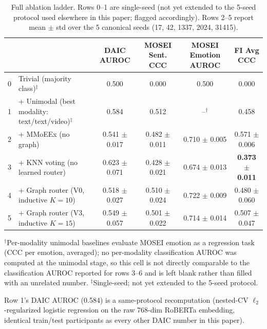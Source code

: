 \documentclass[letterpaper]{article}
\begin{document}
\begin{table}[t]
\centering
\caption{Full ablation ladder. Rows 0--1 are single-seed (not yet extended to the 5-seed protocol used elsewhere in this paper; flagged accordingly). Rows 2--5 report mean $\pm$ std over the 5 canonical seeds (17, 42, 1337, 2024, 31415).}
\label{tab:full_ablation}
\small
\begin{tabular}{llcccc}
\toprule
 & & DAIC AUROC & MOSEI Sent. CCC & MOSEI Emotion AUROC & FI Avg CCC \\
\midrule
0 & Trivial (majority class)$^\ddagger$ & 0.500 & 0.000 & 0.500 & 0.000 \\
1 & + Unimodal (best modality: text/text/video)$^\ddagger$ & 0.584 & 0.512 & --$^\dagger$ & 0.458 \\
2 & + MMoEEx (no graph) & 0.541 $\pm$ 0.017 & 0.482 $\pm$ 0.011 & 0.710 $\pm$ 0.005 & 0.571 $\pm$ 0.006 \\
3 & + KNN voting (no learned router) & 0.623 $\pm$ 0.071 & 0.428 $\pm$ 0.021 & 0.674 $\pm$ 0.013 & \textbf{0.373 $\pm$ 0.011} \\
4 & + Graph router (V0, inductive $K{=}10$) & 0.518 $\pm$ 0.027 & 0.510 $\pm$ 0.024 & 0.722 $\pm$ 0.009 & 0.480 $\pm$ 0.060 \\
5 & + Graph router (V3, inductive $K{=}15$) & 0.549 $\pm$ 0.057 & 0.501 $\pm$ 0.022 & 0.714 $\pm$ 0.014 & 0.507 $\pm$ 0.047 \\
\bottomrule
\end{tabular}

\vspace{2pt}
{\footnotesize $^\dagger$Per-modality unimodal baselines evaluate MOSEI emotion as a regression task (CCC per emotion, averaged); no per-modality classification AUROC was computed at the unimodal stage, so this cell is not directly comparable to the classification AUROC reported for rows 3--6 and is left blank rather than filled with an unrelated number. $^\ddagger$Single-seed; not yet extended to the 5-seed protocol.}
\end{table}

Row 1's DAIC AUROC (0.584) is a same-protocol recomputation (nested-CV $\ell_2$-regularized logistic regression on the raw 768-dim RoBERTa embedding, identical train/test participants as every other DAIC number in this paper).
\end{document}
